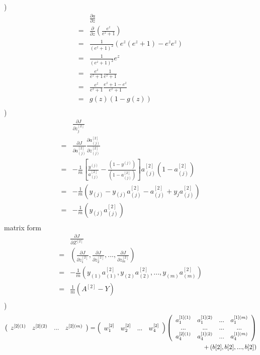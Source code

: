 \documentclass[a4paper]{article}
\begin{document}
) \\
\begin{align*}
  &\frac{\partial a}{\partial z}\\
= & \frac{\partial}{\partial z}(\frac{e^z}{e^z + 1}) \\
= &\frac{1}{(e^z + 1)^2} (e^z(e^z + 1) -e^z e^z) \\
= &\frac{1}{(e^z + 1)^2} e^z \\
= &\frac{e^z}{e^z + 1} \frac{1}{e^z +1} \\
= &\frac{e^z}{e^z + 1} \frac{e^z + 1 -e^z}{e^z +1}\\
= & g(z) (1 -g(z))\\
\end{align*}
)
\begin{align*}
	 &\frac{\partial J}{\partial z_{j}^{[2]}} \\
   = &\frac{\partial J }{\partial a_{(j)}^{[2]}} \frac{\partial a_{(j)}^{[2]} }{\partial z_{(j)}^{[2]}} \\
   = &-\frac{1}{m}  [\frac{y^{(j)}}{ a^{[2]}_{(j)}}
	-\frac{(1-y^{(j)})}{ (1 - a^{[2]}_{(j)})}]
    a^{[2]}_{(j)} (1 - a^{[2]}_{(j)}) \\
   = &-\frac{1}{m} (y_{(j)} - y_{(j)} a_{(j)} ^{[2]} - a_{(j)}^{[2]} + y_{{j}}a_{(j)}^{[2]}) \\   
   =& -\frac{1}{m} (y_{(j)} a_{(j)}^{[2]})\\   
\end{align*}
matrix form
\begin{align*}
	&\frac{\partial J}{\partial Z^{[2]}} \\
  = & (\frac{\partial J}{\partial z_{1}^{[2]}}, \frac{\partial J}{\partial z_{2}^{[2]}},...,\frac{\partial J}{\partial z_{m}^{[2]}} ) \\
  = & -\frac{1}{m} (y_{(1)} a_{(1)}^{[2]}, y_{(2)} a_{(2)}^{[2]},...,y_{(m)} a_{(m)}^{[2]})\\ 	
  = & \frac{1}{m} (A^{[2]} - Y)\\
\end{align*}
)
\begin{align*}
\left( \begin{array} {c c c c}
z^{[2](1)} & z^{[2](2)} & ... & z^{[2](m)} \\
\end{array} \right)
=\left( \begin{array} {c c c c}
w_1^{[2]} & w_2^{[2]} & ... & w_4^{[2]} \\
\end{array} \right)
\left( \begin{array} {c c c c}
a_1^{[1](1)} & a_1^{[1](2)} & ... & a_1^{[1](m)} \\
...& ...& ...&...\\
a_4^{[2](1)} & a_4^{[1](2)} & ... & a_4^{[1](m)} \\
\end{array} \right)\\
+\left( b[2], b[2], ... ,b[2]\right)
\end{align*}
\end{document}
